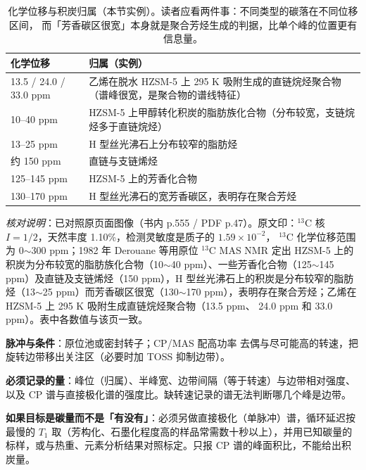 \begin{table}[htbp]
\centering
\caption{ 化学位移与积炭归属（本节实例）。读者应看两件事：不同类型的碳落在不同位移区间，
而「芳香碳区很宽」本身就是聚合芳烃生成的判据，比单个峰的位置更有信息量。}
\label{tab:c13-assign}
{\srcsize
\begin{tabularx}{\columnwidth}{@{}lX@{}}
\toprule
化学位移 & 归属（实例） \\
\midrule
13.5 / 24.0 / 33.0 ppm & 乙烯在脱水 HZSM-5 上 295 K 吸附生成的直链烷烃聚合物（谱峰很宽，是聚合物的谱线特征） \\
10--40 ppm & HZSM-5 上甲醇转化积炭的脂肪族化合物（分布较宽，支链烷烃多于直链烷烃） \\
13--25 ppm & H 型丝光沸石上分布较窄的脂肪烃 \\
约 150 ppm & 直链与支链烯烃 \\
125--145 ppm & HZSM-5 上的芳香化合物 \\
130--170 ppm & H 型丝光沸石的宽芳香碳区，表明存在聚合芳烃 \\
\bottomrule
\end{tabularx}}
\end{table}
\emph{核对说明}：已对照原页面图像（书内 p.555 / PDF p.47）。原文印：$^{13}$C 核
$I=1/2$，天然丰度 1.10\%，检测灵敏度是质子的 $1.59\times10^{-2}$，
$^{13}$C 化学位移范围为 0$\sim$300 ppm；1982 年 Derouane 等用原位
$^{13}$C MAS NMR 定出 HZSM-5 上的积炭为分布较宽的脂肪族化合物（10$\sim$40
ppm）、一些芳香化合物（125$\sim$145 ppm）及直链及支链烯烃（150 ppm），H
型丝光沸石上的积炭是分布较窄的脂肪烃（13$\sim$25 ppm）而芳香碳区很宽（130$\sim$170
ppm），表明存在聚合芳烃；乙烯在 HZSM-5 上 295 K 吸附生成直链烷烃聚合物（13.5 ppm、
24.0 ppm 和 33.0 ppm）。表中各数值与该页一致。

\begin{measure}
\textbf{脉冲与条件}：原位池或密封转子；CP/MAS 配高功率  去偶与尽可能高的转速，把旋转边带移出关注区（必要时加 TOSS 抑制边带）。

\textbf{必须记录的量}：峰位（归属）、半峰宽、边带间隔（等于转速）与边带相对强度、以及 CP 谱与直接极化谱的强度比。缺转速记录的谱无法判断哪几个峰是边带。

\textbf{如果目标是碳量而不是「有没有」}：必须另做直接极化（单脉冲）谱，循环延迟按最慢的  $T_1$ 取（芳构化、石墨化程度高的样品常需数十秒以上），并用已知碳量的标样，或与热重、元素分析结果对照标定。只报 CP 谱的峰面积比，不能给出积炭量。
\end{measure}

